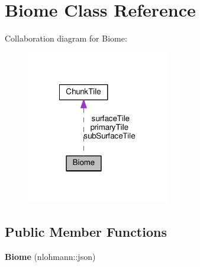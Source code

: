 \hypertarget{classBiome}{\section{Biome Class Reference}
\label{classBiome}
}


Collaboration diagram for Biome\-:
\nopagebreak
\begin{figure}[H]
\begin{center}
\leavevmode
\includegraphics[width=176pt]{classBiome__coll__graph}
\end{center}
\end{figure}
\subsection*{Public Member Functions}
\begin{DoxyCompactItemize}
\item 
\hypertarget{classBiome_a407c0e4263eee9af08e90caf1a7b4184}{{\bfseries Biome} (nlohmann\-::json)}\label{classBiome_a407c0e4263eee9af08e90caf1a7b4184}

\end{DoxyCompactItemize}
